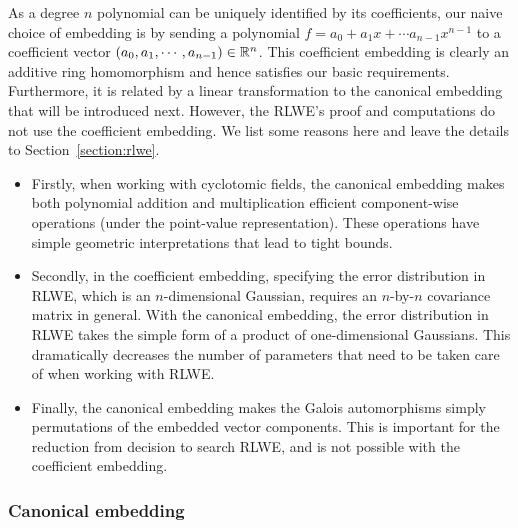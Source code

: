 \documentclass[../main.tex]{subfiles}
\begin{document}
As a degree $n$ polynomial can be uniquely identified by its coefficients, our naive choice of embedding is by sending a polynomial $f=a_0 + a_1 x + \cdots a_{n-1} x^{n-1}$ to a coefficient vector $(a_0, a_1, \cdots, a_{n-1}) \in \mathbb{R}^n$. This coefficient embedding is clearly an additive ring homomorphism and hence satisfies our basic requirements. Furthermore, it is related by a linear transformation to the canonical embedding that will be introduced next. However, the RLWE's proof and computations do not use the coefficient embedding. We list some reasons here and leave the details to Section~\ref{section:rlwe}.  
\begin{itemize}\itemsep1mm\parskip0mm
    \item Firstly, when working with cyclotomic fields, the canonical embedding makes both polynomial addition and multiplication efficient component-wise operations (under the point-value representation). These operations have simple geometric interpretations that lead to tight bounds.
    
    \item Secondly, in the coefficient embedding, specifying the error distribution in RLWE, which is an $n$-dimensional Gaussian, requires an $n$-by-$n$ covariance matrix in general. With the canonical embedding, the error distribution in RLWE takes the simple form of a product of one-dimensional Gaussians. This dramatically decreases the number of parameters that need to be taken care of when working with RLWE.
    
    \item Finally, the canonical embedding makes the Galois automorphisms simply permutations of the embedded vector components. This is important for the reduction from decision to search RLWE, and is not possible with the coefficient embedding.
    
\end{itemize}  


\subsubsection{Canonical embedding}\label{subsec:canonical embedding}
\end{document}
